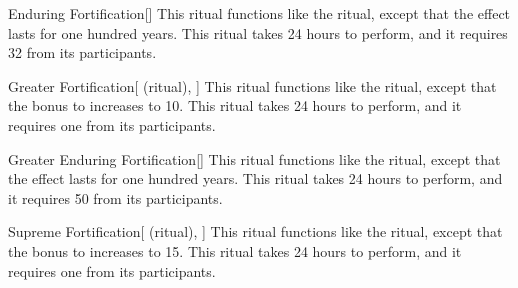 \lowercase{\hypertarget{spell:Enduring Fortification}{}}\label{spell:Enduring Fortification}
\begin{freeability}[Rank 4]{\hypertarget{spell:Enduring Fortification}{Enduring Fortification}}[]
This ritual functions like the  ritual, except that the effect lasts for one hundred years.
This ritual takes 24 hours to perform, and it requires 32  from its participants.
\end{freeability}
\vspace{0.25em}



\lowercase{\hypertarget{spell:Greater Fortification}{}}\label{spell:Greater Fortification}
\begin{attuneability}[Rank 4]{\hypertarget{spell:Greater Fortification}{Greater Fortification}}[ (ritual), ]
This ritual functions like the  ritual, except that the bonus to  increases to 10.
This ritual takes 24 hours to perform, and it requires one  from its participants.
\end{attuneability}
\vspace{0.25em}



\lowercase{\hypertarget{spell:Greater Enduring Fortification}{}}\label{spell:Greater Enduring Fortification}
\begin{freeability}[Rank 5]{\hypertarget{spell:Greater Enduring Fortification}{Greater Enduring Fortification}}[]
This ritual functions like the  ritual, except that the effect lasts for one hundred years.
This ritual takes 24 hours to perform, and it requires 50  from its participants.
\end{freeability}
\vspace{0.25em}



\lowercase{\hypertarget{spell:Supreme Fortification}{}}\label{spell:Supreme Fortification}
\begin{attuneability}[Rank 7]{\hypertarget{spell:Supreme Fortification}{Supreme Fortification}}[ (ritual), ]
This ritual functions like the  ritual, except that the bonus to  increases to 15.
This ritual takes 24 hours to perform, and it requires one  from its participants.
\end{attuneability}
\vspace{0.25em}


